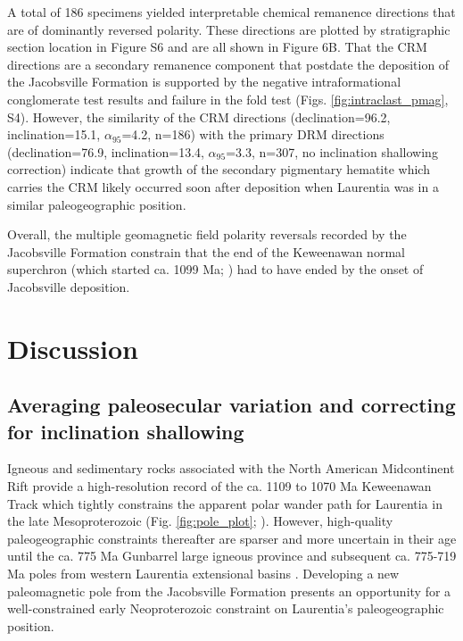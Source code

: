 A total of 186 specimens yielded interpretable chemical remanence directions that are of dominantly reversed polarity. These directions are plotted by stratigraphic section location in Figure S6 and are all shown in Figure 6B. That the CRM directions are a secondary remanence component that postdate the deposition of the Jacobsville Formation is supported by the negative intraformational conglomerate test results and failure in the fold test (Figs. \ref{fig:intraclast_pmag}, S4). However, the similarity of the CRM directions (declination=96.2\textdegree, inclination=15.1\textdegree, $\alpha_{95}$=4.2\textdegree, n=186) with the primary DRM directions (declination=76.9\textdegree, inclination=13.4\textdegree, $\alpha_{95}$=3.3\textdegree, n=307, no inclination shallowing correction) indicate that growth of the secondary pigmentary hematite which carries the CRM likely occurred soon after deposition when Laurentia was in a similar paleogeographic position. 

Overall, the multiple geomagnetic field polarity reversals recorded by the Jacobsville Formation constrain that the end of the Keweenawan normal superchron \citep{Driscoll2016b} (which started ca. 1099 Ma; \cite{Swanson-Hysell2019a}) had to have ended by the onset of Jacobsville deposition.
 
\section*{Discussion}
\subsection*{Averaging paleosecular variation and correcting for inclination shallowing}

Igneous and sedimentary rocks associated with the North American Midcontinent Rift provide a high-resolution record of the ca. 1109 to 1070 Ma Keweenawan Track which tightly constrains the apparent polar wander path for Laurentia in the late Mesoproterozoic (Fig. \ref{fig:pole_plot}; \cite{Swanson-Hysell2019a}). However, high-quality paleogeographic constraints thereafter are sparser and more uncertain in their age until the ca. 775 Ma Gunbarrel large igneous province \citep{Harlan2003a} and subsequent ca. 775-719 Ma poles from western Laurentia extensional basins \citep{Weil2006a, Eyster2019a}. Developing a new paleomagnetic pole from the Jacobsville Formation presents an opportunity for a well-constrained early Neoproterozoic constraint on Laurentia's paleogeographic position. 

